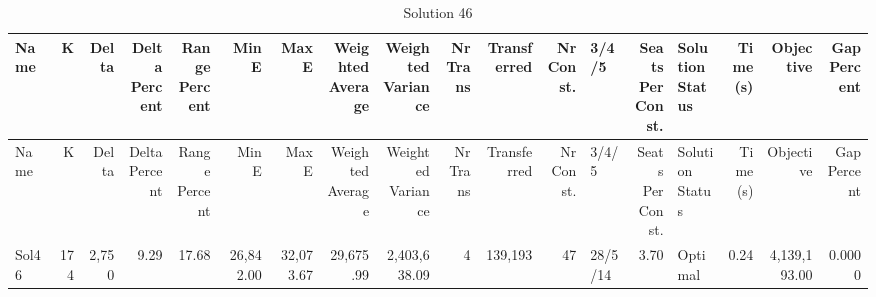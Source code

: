 \documentclass[a4paper]{article}
\begin{document}
{\scriptsize
\begin{longtable}{lrrrrrrrrrrrlrlrrr}
\caption{Solution 46}
\\ \toprule
Name &K &Delta &\shortstack{Delta\\Percent} &\shortstack{Range\\Percent} &Min E &Max E &\shortstack{Weighted\\Average} &\shortstack{Weighted\\Variance} &\shortstack{Nr\\Trans} &Transferred &\shortstack{Nr\\Const.} &3/4/5 &\shortstack{Seats\\Per\\Const.} &\shortstack{Solution\\Status} &\shortstack{Time\\(s)} &Objective &\shortstack{Gap\\Percent} \\ \midrule
\endfirsthead
\toprule
Name &K &Delta &\shortstack{Delta\\Percent} &\shortstack{Range\\Percent} &Min E &Max E &\shortstack{Weighted\\Average} &\shortstack{Weighted\\Variance} &\shortstack{Nr\\Trans} &Transferred &\shortstack{Nr\\Const.} &3/4/5 &\shortstack{Seats\\Per\\Const.} &\shortstack{Solution\\Status} &\shortstack{Time\\(s)} &Objective &\shortstack{Gap\\Percent} \\ \midrule
\endhead
\bottomrule
\endfoot
Sol46&174&2,750& 9.29&17.68&26,842.00&32,073.67&29,675.99&2,403,638.09&4&139,193&47&28/5/14& 3.70&Optimal& 0.24&4,139,193.00&0.0000\\ 
\end{longtable}

}
\end{document}
